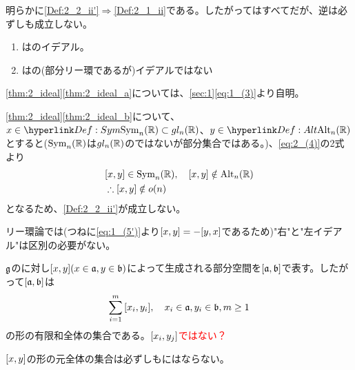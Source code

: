 \documentclass[../main]{subfiles}
\begin{document}
\begin{remark}
  明らかに\ref{Def:2_2_ii'}$\Rightarrow$\ref{Def:2_1_ii}である。したがって{}はすべて{}だが、逆は必ずしも成立しない。
\end{remark}
\begin{theorem}\label{thm:2_ideal}
  \begin{enumerate}[label=(\alph*)]
    \item \label{thm:2_ideal_a}はのイデアル。
    \item \label{thm:2_ideal_b}はの(部分リー環であるが)イデアルではない
  \end{enumerate}
\end{theorem}

\begin{Proof} \cref{thm:2_ideal}\ref{thm:2_ideal_a}については、\cref{sec:1}\eqref{eq:1_(3)}より自明。
\end{Proof}

\begin{Proof} \cref{thm:2_ideal}\ref{thm:2_ideal_b}について、$x\in\hlin{Def:Sym}{\Sym_n(\R)}\subset\gl_n(\R)$、$y\in\hlin{Def:Alt}{\Alt_n(\R)}$とすると($\operatorname{Sym}_n(\mathbb{R})$は$gl_n(\mathbb{R})$の{}ではないが部分集合ではある。)、\eqref{eq:2_(4)}の2式より
  \begin{align*}
    &\comm{x}{y}\in\Sym_n(\R)\qc
    \comm{x}{y}\notin\Alt_n(\R)\\
    &\therefore \comm{x}{y}\notin\o(n)
  \end{align*}
  となるため、\ref{Def:2_2_ii'}が成立しない。
\end{Proof}

\begin{remark}
  リー環論では(つねに\eqref{eq:1_(5')}より$\comm{x}{y}=-\comm{y}{x}$であるため)"右{}"と"左イデアル"は区別の必要がない。
\end{remark}

\begin{named}
  $\mathfrak{g}$の{}に対し$\comm{x}{y}(x\in\a,y\in\b)$によって生成される部分空間を$\comm{\a}{\b}$で表す。したがって$\comm{\a}{\b}$は
  \begin{align*}
    \sum_{i=1}^{m}\comm{x_{i}}{y_{i}}\qc x_{i}\in\a,y_{i}\in\b,m\ge1
  \end{align*}
  の形の有限和全体の集合である。\textcolor{red}{$\comm{x_{i}}{y_{j}}$ではない？}
\end{named}
\begin{remark}
  $\comm{x}{y}$の形の元全体の集合は必ずしも{}にはならない。
\end{remark}
\end{document}
